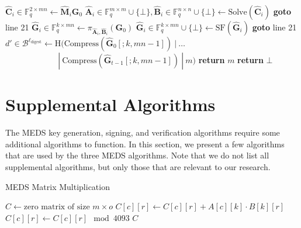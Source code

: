 \begin{algorithm}[H]
\begin{algorithmic}[1]
        \State $\hat{\textbf{C}}_i \in \mathds{F}_q^{2 \times mn} \gets \hat{\textbf{M}}_i \textbf{G}_0$
        \State $\hat{\textbf{A}}_i \in \mathds{F}_q^{m \times m} \cup \{\bot\}, \hat{\textbf{B}}_i \in \mathds{F}_q^{n \times n} \cup \{\bot\} \gets \text{Solve}(\hat{\textbf{C}}_i)$
            \State \textbf{goto} line 21
        \EndIf
        \State $\hat{\textbf{G}}_i \in \mathds{F}_q^{k \times mn} \gets \pi_{\hat{\textbf{A}}_i, \hat{\textbf{B}}_i}(\textbf{G}_0)$
        \State $\hat{\textbf{G}}_i \in \mathds{F}_q^{k \times mn} \cup \{\bot\} \gets \text{SF}(\hat{\textbf{G}}_i)$
            \State \textbf{goto} line 21
        \EndIf
    \EndIf
\EndFor
\State $d' \in \mathcal{B}^{\ell_\text{digest}} \gets \text{H}(\text{Compress}(\hat{\textbf{G}}_0[;k,mn-1])~|~\ldots$\\
$\quad\quad\quad\quad\quad\quad~~|~\text{Compress}(\hat{\textbf{G}}_{t-1}[;k,mn-1])~|~m)$
    \State \textbf{return} $m$
\Else
    \State \textbf{return} $\bot$
\EndIf
\end{algorithmic}
\end{algorithm}

\section{Supplemental Algorithms}
\label{app:supplementalalgs}
The MEDS key generation, signing, and verification algorithms require some additional algorithms to function. In this section, we present a few algorithms that are used by the three MEDS algorithms. Note that we do not list all supplemental algorithms, but only those that are relevant to our research.

\begin{algorithm}
  \caption{MEDS Matrix Multiplication}
  \label{alg:medsmatrixmultiplication}
  \begin{algorithmic}
      \State $C \gets \text{zero matrix of size } m \times o$
            \State $C[c][r] \gets C[c][r] + A[c][k] \cdot B[k][r]$
          \EndFor
          \State $C[c][r] \gets C[c][r] \mod 4093$
        \EndFor
      \EndFor
      \State \Return $C$
    \EndFunction
  \end{algorithmic}
\end{algorithm}

